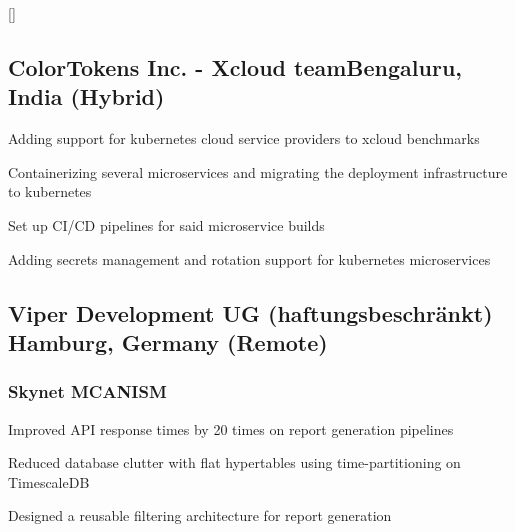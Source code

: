 \documentclass[letter,10pt]{article}
\begin{document}
\titlespacing*{\subsubsection}{0em}{0em}{0em}
\titleformat{\subsubsection}{\itshape}{}{0em}{}[]


\subsection{ColorTokens Inc. - Xcloud team\hfill Bengaluru, India (Hybrid)}
\begin{zitemize}
\item Adding support for kubernetes cloud service providers to xcloud benchmarks
\item Containerizing several microservices and migrating the deployment infrastructure to kubernetes
\item Set up CI/CD pipelines for said microservice builds
\item Adding secrets management and rotation support for kubernetes microservices
\end{zitemize}


\subsection{Viper Development UG (haftungsbeschränkt) \hfill Hamburg, Germany (Remote)}

\vspace{1em}
\subsubsection*{Skynet MCANISM}
\begin{zitemize}
\item Improved API response times by 20 times on report generation pipelines
\item Reduced database clutter with flat hypertables using time-partitioning on TimescaleDB
\item Designed a reusable filtering architecture for report generation
\end{zitemize}
\end{document}
